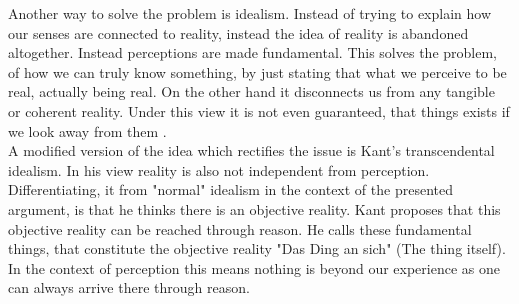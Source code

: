 \documentclass[fleqn,14pt]{article}
\begin{document}
Another way to solve the problem is idealism. Instead of trying to explain how our senses are connected
to reality, instead the idea of reality is abandoned altogether. Instead perceptions are made fundamental.
This solves the problem, of how we can truly know something, by just stating that what we perceive
to be real, actually being real. On the other hand it disconnects us from any tangible or coherent reality.
Under this view it is not even guaranteed, that things exists if we look away 
from them \cite[p.73ff]{pritchard}.\\
A modified version of the idea which rectifies the issue is Kant's transcendental idealism.
In his view reality is also not independent from 
perception. Differentiating, it from "normal" idealism in the context of the presented argument, is
that he thinks there is an objective reality\cite{otfried}. Kant proposes that this objective reality can be reached through
reason. He calls these fundamental things, that constitute the objective
reality "Das Ding an sich" (The thing itself). In the context of perception this means nothing is beyond our
experience as one can always arrive there through reason. \\
\\
\end{document}
